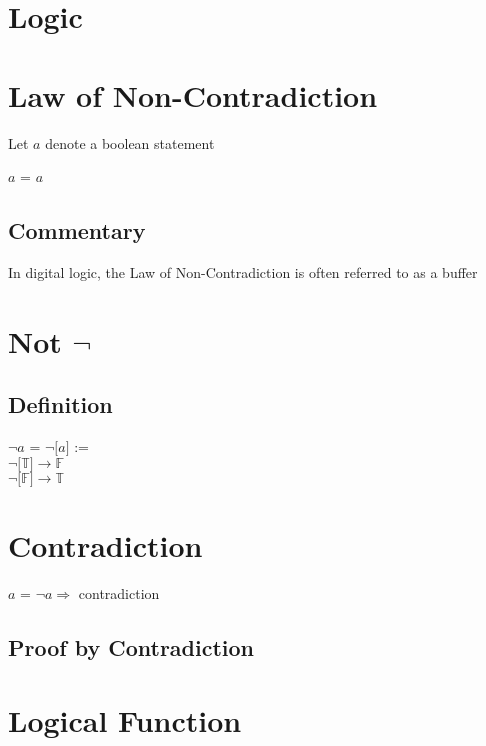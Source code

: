 \documentclass[11pt]{article}
\begin{document}
\section*{Logic}



\section{Law of Non-Contradiction}
Let $a$ denote a boolean statement
\begin{center}
$a$ = $a$
\end{center}
\subsection{Commentary}
In digital logic, the Law of Non-Contradiction is often referred to as a buffer




\section{Not $\lnot$}
\subsection{Definition}
\begin{center}
$\lnot a$ = $\lnot \lbrack a \rbrack$ :=\\
\vspace{2mm}
$\lnot \lbrack \mathbb{T} \rbrack \rightarrow \mathbb{F}$\\
\vspace{2mm}
$\lnot \lbrack \mathbb{F} \rbrack \rightarrow \mathbb{T}$
\end{center}





\section{Contradiction}
\begin{center}
$a$ = $\lnot a \Rightarrow$ contradiction
\end{center}
\subsection{Proof by Contradiction}




\newpage
\section{Logical Function}
\end{document}
